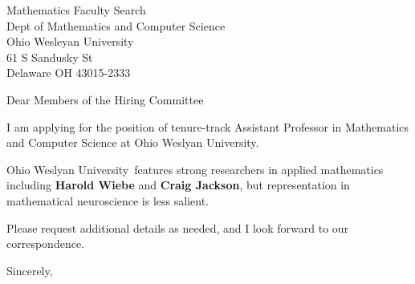 




	
	
	\def\School{Ohio Weslyan University}
	
	\begin{letter}
		{Mathematics Faculty Search\\
		Dept of Mathematics and Computer Science\\
		Ohio Wesleyan University\\
		61 S Sandusky St\\
		Delaware OH 43015-2333
		
		}
		
		\opening{Dear Members of the Hiring Committee}
		
		
		I am applying for the position of tenure-track Assistant Professor in Mathematics and Computer Science at \School. 
		
		\School~features strong researchers in applied mathematics including \textbf{Harold Wiebe} and \textbf{Craig Jackson}, but representation in mathematical neuroscience is less salient.  
		
		
		
		
		
		Please request additional details as needed, and I look forward to our correspondence.
		
		\closing{Sincerely,}
	\end{letter}
